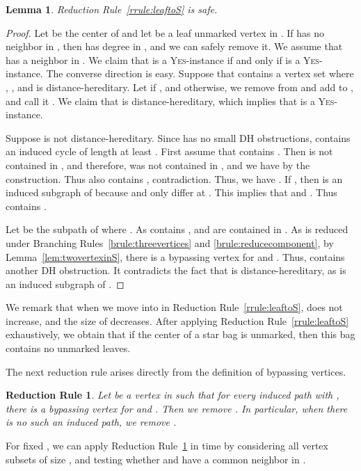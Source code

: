 \documentclass[11pt]{elsarticle}
\newtheorem{lemma}[theorem]{Lemma}
\newtheorem{RRULE}{Reduction Rule}
\newcommand{\YES}{\textsc{Yes}}
\begin{document}
\begin{lemma}
\label{lem:leaftoS}
Reduction Rule~\ref{rrule:leaftoS} is safe.
\end{lemma}
\begin{proof}
Let  be the center of  and let  be a leaf unmarked vertex in .
If  has no neighbor in , then  has degree  in , and we can safely remove it.
We assume that  has a neighbor in .
We claim that  is a \YES-instance if and only if  is a \YES-instance.
The converse direction is easy. Suppose that  contains a vertex set  where , , and  is distance-hereditary. 
Let  if , and otherwise, we remove  from  and add  to , and call it .
We claim that 
 is distance-hereditary, which implies that  is a \YES-instance.

Suppose  is not distance-hereditary.
Since  has no small DH obstructions,  contains an induced cycle  of length at least .
First assume that  contains . 
Then  is not contained in , and therefore,  was not contained in , and we have  by the construction. Thus  also contains , contradiction.
Thus, we have . 
If , then  is an induced subgraph of  because  and  only differ at .
This implies that  and . Thus  contains .

Let  be the subpath of  where .
As  contains , 
 and  are contained in .
As  is reduced under Branching Rules~\ref{brule:threevertices} and \ref{brule:reducecomponent}, 
by Lemma~\ref{lem:twovertexinS}, there is a bypassing vertex for  and .
Thus,  contains another DH obstruction.
It contradicts the fact that  is distance-hereditary, as  is an induced subgraph of .
\end{proof}

We remark that when we move  into  in Reduction Rule~\ref{rrule:leaftoS}, 
 does not increase, and the size of  decreases.
After applying Reduction Rule~\ref{rrule:leaftoS} exhaustively, we obtain that 
if the center of a star bag is unmarked, then this bag contains no unmarked leaves.


The next reduction rule arises directly from the definition of bypassing vertices.

\begin{RRULE}\label{rrule:p5middle}
Let  be a vertex in  such that 
for every induced path  with , 
there is a bypassing vertex for  and .
Then we remove . In  particular, when there is no such an induced path, we remove .
\end{RRULE}

For fixed , we can apply Reduction Rule~\ref{rrule:p5middle} in time  by considering all vertex subsets of size , 
and testing whether  and  have a common neighbor in .
\end{document}
